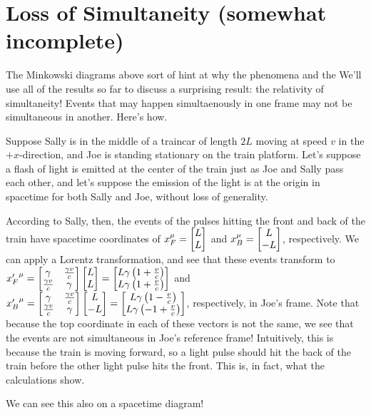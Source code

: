 \documentclass[12pt]{scrartcl}
\begin{document}
\section{Loss of Simultaneity (somewhat incomplete)}
The Minkowski diagrams above sort of hint at why the phenomena and the
We'll use all of the results so far to discuss a surprising result: the relativity of simultaneity! Events that may happen simultaenously in one frame may not be simultaneous in another. Here's how.

Suppose Sally is in the middle of a traincar of length $2L$ moving at speed $v$ in the $+x$-direction, and Joe is standing stationary on the train platform. Let's suppose a flash of light is emitted at the center of the train just as Joe and Sally pass each other, and let's suppose the emission of the light is at the origin in spacetime for both Sally and Joe, without loss of generality.

According to Sally, then, the events of the pulses hitting the front and back of the train have spacetime coordinates of $x_F^\mu = \begin{bmatrix}L \\ L\end{bmatrix}$ and $x_B^\mu = \begin{bmatrix}L \\ -L\end{bmatrix}$, respectively. We can apply a Lorentz transformation, and see that these events transform to ${x'_F}^\mu = \begin{bmatrix}\gamma & \frac{\gamma v}{c} \\ \frac{\gamma v}{c} & \gamma\end{bmatrix}  \begin{bmatrix}L \\ L\end{bmatrix} =
	\begin{bmatrix}L\gamma\left(1+\frac{v}{c}\right) \\ L\gamma\left(1+\frac{v}{c}\right)\end{bmatrix}$ and
${x'_B}^\mu = \begin{bmatrix}\gamma & \frac{\gamma v}{c} \\ \frac{\gamma v}{c} & \gamma\end{bmatrix}  \begin{bmatrix}L \\ -L\end{bmatrix} = \begin{bmatrix}L\gamma\left(1-\frac{v}{c}\right) \\ L\gamma\left(-1+\frac{v}{c}\right)\end{bmatrix}$, respectively, in Joe's frame. Note that because the top coordinate in each of these vectors is not the same, we see that the events are not simultaneous in Joe's reference frame! Intuitively, this is because the train is moving forward, so a light pulse should hit the back of the train  before the other light pulse hits the front. This is, in fact, what the calculations show.

We can see this also on a spacetime diagram!
\end{document}
